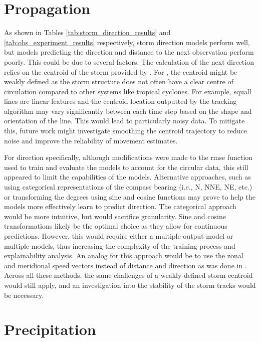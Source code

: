 \section{Propagation}
\label{sec:discuss-propagation}

As shown in Tables \ref{tab:storm_direction_results} and \ref{tab:obs_experiment_results} respectively, storm direction models perform well, but models predicting the direction and distance to the next observation perform poorly. This could be due to several factors. The calculation of the next direction relies on the centroid of the storm provided by \cite{Hill2023}. For , the centroid might be weakly defined as the storm structure does not often have a clear centre of circulation compared to other systems like tropical cyclones. For example, squall lines are linear features and the centroid location outputted by the tracking algorithm may vary significantly between each time step based on the shape and orientation of the line. This would lead to particularly noisy data. To mitigate this, future work might investigate smoothing the centroid trajectory to reduce noise and improve the reliability of movement estimates.

For direction specifically, although modifications were made to the \acrshort{rmse} function used to train and evaluate the models to account for the circular data, this still appeared to limit the capabilities of the models. Alternative approaches, such as using categorical representations of the compass bearing (i.e., N, NNE, NE, etc.) or transforming the degrees using sine and cosine functions may prove to help the models more effectively learn to predict direction. The categorical approach would be more intuitive, but would sacrifice granularity. Sine and cosine transformations likely be the optimal choice as they allow for continuous predictions. However, this would require either a multiple-output model or multiple models, thus increasing the complexity of the training process and explainability analysis. An analog for this approach would be to use the zonal and meridional speed vectors instead of distance and direction as was done in \cite{Hunt2024}. Across all these methods, the same challenges of a weakly-defined storm centroid would still apply, and an investigation into the stability of the storm tracks would be necessary.

\section{Precipitation}

